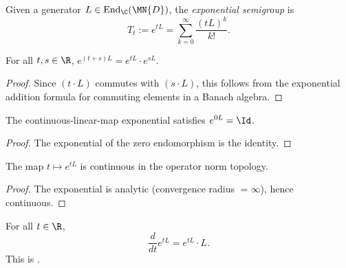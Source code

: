 \begin{definition}\label{def:exp_semigroup_ch12}
    \leanok
    Given a generator $L \in \mathrm{End}_{\C}(\MN{D})$, the
    \emph{exponential semigroup} is
    \[
        T_t := e^{tL} = \sum_{k=0}^{\infty} \frac{(tL)^k}{k!}.
    \]
\end{definition}

\begin{theorem}\label{thm:expSemigroupCLM_add_ch12}
    \leanok
    For all $t,s \in \R$,
    $e^{(t+s)L} = e^{tL} \cdot e^{sL}$.
\end{theorem}

\begin{proof}
    \leanok
    Since $(t \cdot L)$ commutes with $(s \cdot L)$, this follows from
    the exponential addition formula for commuting elements in a
    Banach algebra.
\end{proof}

\begin{theorem}
    \label{thm:expSemigroupCLM_zero_ch12}
    \leanok
    The continuous-linear-map exponential satisfies $e^{0L} = \Id$.
\end{theorem}

\begin{proof}
    \leanok
    The exponential of the zero endomorphism is the identity.
\end{proof}

\begin{theorem}\label{thm:expSemigroupCLM_continuous_ch12}
    \leanok
    The map $t \mapsto e^{tL}$ is continuous in the operator norm topology.
\end{theorem}

\begin{proof}
    \leanok
    The exponential is analytic (convergence radius $= \infty$), hence
    continuous.
\end{proof}

\begin{theorem}\label{thm:hasDerivAt_expSemigroupCLM_ch12}
    \leanok
    For all $t \in \R$,
    \[
        \frac{d}{dt} e^{tL} = e^{tL} \cdot L.
    \]
    This is \cite[Equation~(7.2)]{Wolf2012Quantum}.
\end{theorem}

